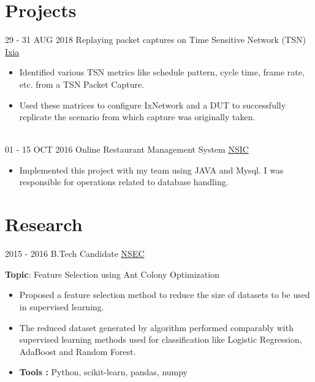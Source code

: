 \documentclass[letterpaper]{twentysecondcv} %
\begin{document}
\section{Projects}
\begin{twenty}
     \twentyitem
   		{29 - 31 AUG}
		{2018}
        {Replaying packet captures on Time Sensitive Network (TSN)}
        {\href{https://www.ixiacom.com/keysight-technologies/}{Ixia}}
        {}
        {
        {\begin{itemize}
        \item
        Identified various TSN metrics like schedule pattern, cycle time, frame rate, etc. from a TSN Packet Capture. \item Used these matrices to configure IxNetwork and a DUT to successfully replicate the scenario from which capture was originally taken.\end{itemize}}
        }
   \\
	\twentyitem
    	{01 - 15 OCT}
        {2016}
        {Online Restaurant Management System}
        {\href{http://www.nsic.co.in/NTSC/NTSC-Howrah.aspx/}{NSIC}}
        {}
        {{\begin{itemize}
        \item
       	Implemented this project with my team using JAVA and Mysql. I was responsible for operations related to database handling.
 \end{itemize}}

  }
   
\end{twenty}
\section{Research}
\begin{twenty}
	\twentyitem
    	{2015 - 2016}
		{}
        {B.Tech Candidate}
        {\href{http://www.nsec.ac.in/}{NSEC}}
        {}
        {
       	\textbf{Topic}: Feature Selection using Ant Colony Optimization
        {\begin{itemize}
        \item Proposed a feature selection method to reduce the size of datasets to be used in supervised learning. \item The reduced dataset generated by algorithm performed comparably with  supervised learning methods used for classification like Logistic Regression, AdaBoost and Random Forest. 
        \item \textbf{Tools :} Python, scikit-learn, pandas, numpy \vspace{2mm}
		\end{itemize}}
        }
\end{twenty}


\end{document}
